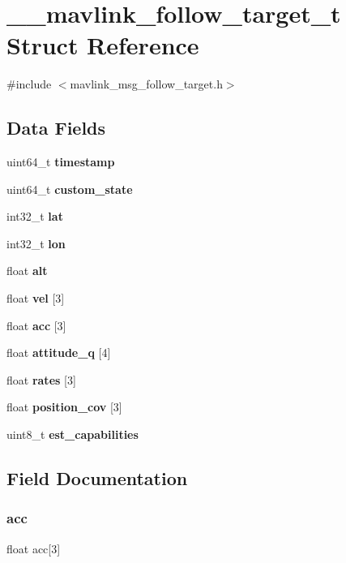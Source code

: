 \section{\+\_\+\+\_\+mavlink\+\_\+follow\+\_\+target\+\_\+t Struct Reference}
\label{struct____mavlink__follow__target__t}


{\ttfamily \#include $<$mavlink\+\_\+msg\+\_\+follow\+\_\+target.\+h$>$}

\subsection*{Data Fields}
\begin{DoxyCompactItemize}
\item 
uint64\+\_\+t \textbf{ timestamp}
\item 
uint64\+\_\+t \textbf{ custom\+\_\+state}
\item 
int32\+\_\+t \textbf{ lat}
\item 
int32\+\_\+t \textbf{ lon}
\item 
float \textbf{ alt}
\item 
float \textbf{ vel} [3]
\item 
float \textbf{ acc} [3]
\item 
float \textbf{ attitude\+\_\+q} [4]
\item 
float \textbf{ rates} [3]
\item 
float \textbf{ position\+\_\+cov} [3]
\item 
uint8\+\_\+t \textbf{ est\+\_\+capabilities}
\end{DoxyCompactItemize}


\subsection{Field Documentation}
\mbox{\label{struct____mavlink__follow__target__t_aa71c43964fa7767f0461b2a0e0c0b151}} 
\subsubsection{acc}
{\footnotesize\ttfamily float acc[3]}

\mbox{\label{struct____mavlink__follow__target__t_adbf37c628254d78394e4533464a31a8a}} 
